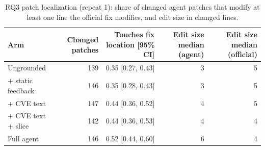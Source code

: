 \begin{table}[t]
\centering\small
\caption{RQ3 patch localization (repeat 1): share of changed agent patches that modify at least one line the official fix modifies, and edit size in changed lines.}
\label{tab:t5}
\begin{tabular}{lrrrr}
\toprule
Arm & Changed patches & Touches fix location [95\% CI] & Edit size median (agent) & Edit size median (official) \\
\midrule
Ungrounded & 139 & 0.35 [0.27, 0.43] & 3 & 5 \\
+ static feedback & 146 & 0.35 [0.28, 0.43] & 3 & 5 \\
+ CVE text & 147 & 0.44 [0.36, 0.52] & 4 & 5 \\
+ CVE text + slice & 142 & 0.44 [0.36, 0.53] & 4 & 4 \\
Full agent & 146 & 0.52 [0.44, 0.60] & 6 & 4 \\
\bottomrule
\end{tabular}
\end{table}
